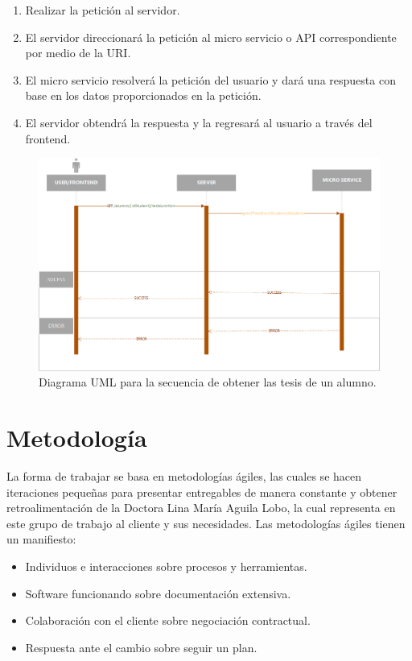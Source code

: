     \begin{enumerate}
        \item Realizar la petición al servidor.
        \item El servidor direccionará la petición al micro servicio o API correspondiente por medio de la URI.
        \item El micro servicio resolverá la petición del usuario y dará una respuesta con base en los datos proporcionados en la petición.
        \item El servidor obtendrá la respuesta y la regresará al usuario a través del frontend.
    \end{enumerate}
    
    \begin{figure}[H]
        \centering
        \includegraphics[width=\textwidth]{Propuesta_Plantilla_Tesis_LaTeX_UAG/imagenes/getAllTesisFromStudents_sequence_diagram.png}
        \caption{Diagrama UML para la secuencia de obtener las tesis de un alumno.}
        \label{fig:getAllTesisFromStudents}
    \end{figure}

\section{Metodología}

    La forma de trabajar se basa en metodologías ágiles, las cuales se hacen iteraciones pequeñas para presentar entregables de manera constante y obtener retroalimentación de la Doctora Lina María Aguila Lobo, la cual representa en este grupo de trabajo al cliente y sus necesidades. Las metodologías ágiles tienen un manifiesto\cite{AgileManifesto}:
    
    \begin{itemize}
        \item Individuos e interacciones sobre procesos y herramientas. \cite{AgileManifesto}
        \item Software funcionando sobre documentación extensiva. \cite{AgileManifesto}
        \item Colaboración con el cliente sobre negociación contractual. \cite{AgileManifesto}
        \item Respuesta ante el cambio sobre seguir un plan. \cite{AgileManifesto}
    \end{itemize}
    
